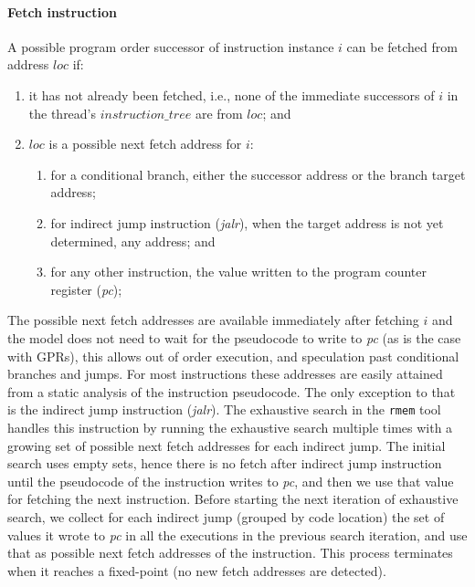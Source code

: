 \paragraph{Fetch instruction}\label{omm:thread:fetch}
A possible program order successor of instruction instance $i$ can be fetched from address $loc$ if:
\begin{enumerate}
\item it has not already been fetched, i.e., none of the immediate successors of $i$ in the thread's $instruction\_tree$ are from $loc$; and
\item $loc$ is a possible next fetch address for $i$:
  \begin{enumerate}
  \item for a conditional branch, either the successor address or the branch target address;
  \item for indirect jump instruction ({\em jalr}), when the target address is not yet determined, any address; and
  \item for any other instruction, the value written to the program counter register ({\em pc});
  \end{enumerate}
\end{enumerate}

\begin{commentary}
The possible next fetch addresses are available immediately after fetching $i$ and the model does not need to wait for the pseudocode to write to {\em pc} (as is the case with GPRs), this allows out of order execution, and speculation past conditional branches and jumps.
For most instructions these addresses are easily attained from a static analysis of the instruction pseudocode.
The only exception to that is the indirect jump instruction ({\em jalr}).
%
The exhaustive search in the {\tt rmem} tool handles this instruction by running the exhaustive search multiple times with a growing set of possible next fetch addresses for each indirect jump.
The initial search uses empty sets, hence there is no fetch after indirect jump instruction until the pseudocode of the instruction writes to {\em pc}, and then we use that value for fetching the next instruction.
Before starting the next iteration of exhaustive search, we collect for each indirect jump (grouped by code location) the set of values it wrote to {\em pc} in all the executions in the previous search iteration, and use that as possible next fetch addresses of the instruction.
This process terminates when it reaches a fixed-point (no new fetch addresses are detected).
\end{commentary}

